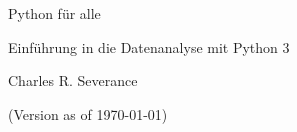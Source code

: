 \begin{titlepage}
\begin{center}
\vspace*{30mm}

\sffamily
\LARGE
Python für alle

\large
Einführung in die Datenanalyse mit Python 3

\vspace{15mm}

\large
Charles R. Severance

\vspace{17cm}

\normalsize
(Version as of \today)

\end{center}
\end{titlepage}

\normalsize
\normalfont
